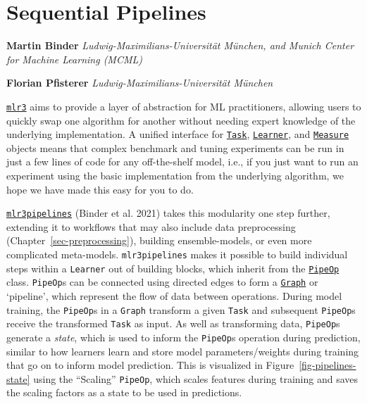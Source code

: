 \hypertarget{sec-pipelines}{%
\chapter{Sequential Pipelines}\label{sec-pipelines}}

\vspace{-15mm}

\textbf{Martin Binder} \newline  \emph{Ludwig-Maximilians-Universität
München, and Munich Center for Machine Learning (MCML)}

\textbf{Florian Pfisterer} \newline 
\emph{Ludwig-Maximilians-Universität München} \newline \newline 

\href{https://mlr3.mlr-org.com}{\texttt{mlr3}} aims
to provide a layer of abstraction for ML practitioners, allowing users
to quickly swap one algorithm for another without needing expert
knowledge of the underlying implementation. A unified interface for
\href{https://mlr3.mlr-org.com/reference/Task.html}{\texttt{Task}},
\href{https://mlr3.mlr-org.com/reference/Learner.html}{\texttt{Learner}},
and
\href{https://mlr3.mlr-org.com/reference/Measure.html}{\texttt{Measure}}
objects means that complex benchmark and tuning experiments can be run
in just a few lines of code for any off-the-shelf model, i.e., if you
just want to run an experiment using the basic implementation from the
underlying algorithm, we hope we have made this easy for you to do.

\href{https://mlr3pipelines.mlr-org.com}{\texttt{mlr3pipelines}}
(Binder et al. 2021) takes this modularity one step further, extending
it to workflows that may also include data
preprocessing (Chapter~\ref{sec-preprocessing}),
building ensemble-models, or even more complicated
meta-models. \texttt{mlr3pipelines} makes it possible to build
individual steps within a \texttt{Learner} out of building blocks, which
inherit from the
\href{https://mlr3pipelines.mlr-org.com/reference/PipeOp.html}{\texttt{PipeOp}}
class. \texttt{PipeOp}s can be connected using directed edges to form a
\href{https://mlr3pipelines.mlr-org.com/reference/Graph.html}{\texttt{Graph}}
or `pipeline', which represent the flow of data between operations.
During model training, the \texttt{PipeOp}s in a \texttt{Graph}
transform a given \texttt{Task} and subsequent \texttt{PipeOp}s receive
the transformed \texttt{Task} as input. As well as transforming data,
\texttt{PipeOp}s generate a \emph{state}, which is used to inform the
\texttt{PipeOp}s operation during prediction, similar to how learners
learn and store model parameters/weights during training that go on to
inform model prediction. This is visualized in
Figure~\ref{fig-pipelines-state} using the ``Scaling'' \texttt{PipeOp},
which scales features during training and saves the scaling factors as a
state to be used in predictions.

